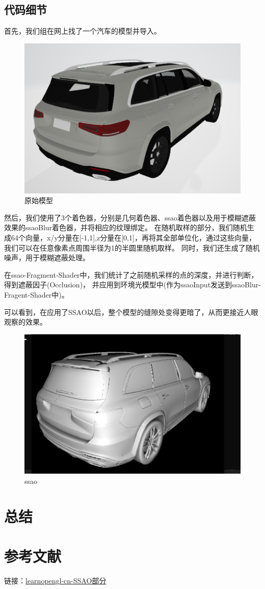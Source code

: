 \documentclass[UTF8,a4paper,12pt,oneside]{article}
\begin{document}
\subsection{代码细节}
首先，我们组在网上找了一个汽车的模型并导入。
\begin{figure}[!h]
    \centering
    \caption[short]{原始模型}
    \includegraphics[scale=0.8]{Figure/model.png}
\end{figure}

然后，我们使用了3个着色器，分别是几何着色器、ssao着色器以及用于模糊遮蔽效果的ssaoBlur着色器，并将相应的纹理绑定。
在随机取样的部分，我们随机生成64个向量，x/y分量在[-1,1],z分量在[0,1]，再将其全部单位化，通过这些向量，我们可以在任意像素点周围半径为1的半圆里随机取样。
同时，我们还生成了随机噪声，用于模糊遮蔽处理。

在ssao-Fragment-Shader中，我们统计了之前随机采样的点的深度，并进行判断，得到遮蔽因子(Occlusion)，
并应用到环境光模型中(作为ssaoInput发送到ssaoBlur-Fragent-Shader中)。

可以看到，在应用了SSAO以后，整个模型的缝隙处变得更暗了，从而更接近人眼观察的效果。
\begin{figure}[!h]
    \centering
    \caption[short]{ssao}
    \includegraphics[scale=0.8]{Figure/ssao_result.png}
\end{figure}

\section{总结}



\section{参考文献}
链接：\href{https://learnopengl-cn.github.io/05%20Advanced%20Lighting/09%20SSAO/}{learnopengl-cn-SSAO部分}
\end{document}
